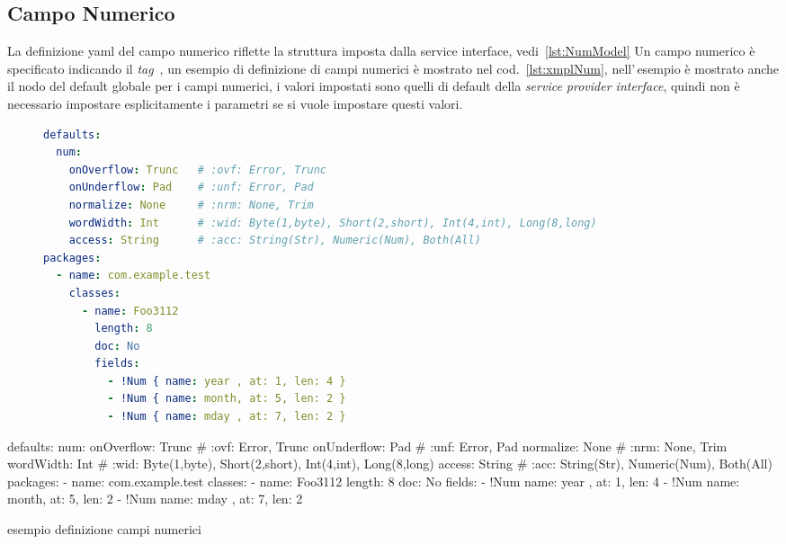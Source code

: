 \subsection{Campo Numerico} \label{sub:yaml.num}
La definizione yaml del campo numerico riflette la struttura imposta dalla
service interface, vedi~\ref{lst:NumModel}
Un campo numerico è specificato indicando il \textsl{tag} 
\,, 
un esempio di definizione di campi numerici è mostrato nel 
cod.~\ref{lst:xmplNum}, nell'\,esempio è mostrato anche il nodo del default
globale per i campi numerici, i valori impostati sono quelli di default
della \textsl{service provider interface}, quindi non è necessario impostare
esplicitamente i parametri se si vuole impostare questi valori.

\ifesource
\begin{figure*}[!htb]
\begin{lstlisting}[language=yaml, caption={esempio definizione campi numerici}, 
label=lst:xmplNum]
defaults:
  num:
    onOverflow: Trunc   # :ovf: Error, Trunc
    onUnderflow: Pad    # :unf: Error, Pad
    normalize: None     # :nrm: None, Trim
    wordWidth: Int      # :wid: Byte(1,byte), Short(2,short), Int(4,int), Long(8,long)
    access: String      # :acc: String(Str), Numeric(Num), Both(All)
packages:
  - name: com.example.test
    classes:
      - name: Foo3112
        length: 8
        doc: No
        fields:
          - !Num { name: year , at: 1, len: 4 }
          - !Num { name: month, at: 5, len: 2 }
          - !Num { name: mday , at: 7, len: 2 }
\end{lstlisting}
\end{figure*}
\else
\begin{elisting}[!htb]
\begin{yamlcode}
defaults:
  num:
    onOverflow: Trunc   # :ovf: Error, Trunc
    onUnderflow: Pad    # :unf: Error, Pad
    normalize: None     # :nrm: None, Trim
    wordWidth: Int      # :wid: Byte(1,byte), Short(2,short), Int(4,int), Long(8,long)
    access: String      # :acc: String(Str), Numeric(Num), Both(All)
packages:
  - name: com.example.test
    classes:
      - name: Foo3112
        length: 8
        doc: No
        fields:
          - !Num { name: year , at: 1, len: 4 }
          - !Num { name: month, at: 5, len: 2 }
          - !Num { name: mday , at: 7, len: 2 }
\end{yamlcode}
\caption{esempio definizione campi numerici}
\label{lst:xmplNum}
\end{elisting}
\fi


